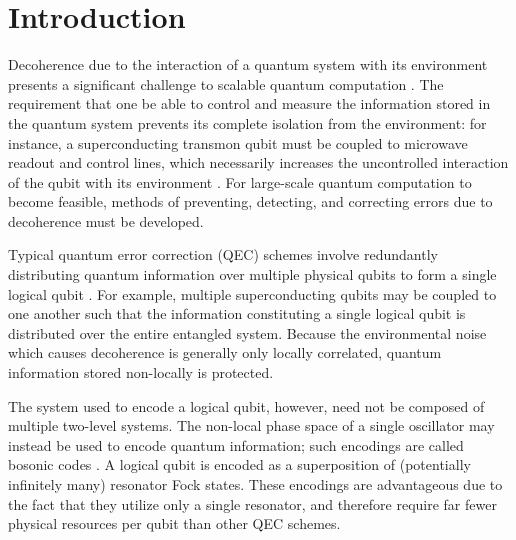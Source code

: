 \section{Introduction}

Decoherence due to the interaction of a quantum system with its environment presents a significant challenge to scalable quantum computation \cite{nielsen_chuang_2010}.
The requirement that one be able to control and measure the information stored in the quantum system prevents its complete isolation from the environment: for instance, a superconducting transmon qubit must be coupled to microwave readout and control lines, which necessarily increases the uncontrolled interaction of the qubit with its environment \cite{devoret_2013,wendin_2017}.
For large-scale quantum computation to become feasible, methods of preventing, detecting, and correcting errors due to decoherence must be developed.

Typical quantum error correction (QEC) schemes involve redundantly distributing quantum information over multiple physical qubits to form a single logical qubit \cite{nielsen_chuang_2010,wendin_2017,devoret_2013,raussendorf_2012}.
For example, multiple superconducting qubits may be coupled to one another such that the information constituting a single logical qubit is distributed over the entire entangled system.
Because the environmental noise which causes decoherence is generally only locally correlated, quantum information stored non-locally is protected.

The system used to encode a logical qubit, however, need not be composed of multiple two-level systems.
The non-local phase space of a single oscillator may instead be used to encode quantum information; such encodings are called bosonic codes \cite{cai_2021}.
A logical qubit is encoded as a superposition of (potentially infinitely many) resonator Fock states.
These encodings are advantageous due to the fact that they utilize only a single resonator, and therefore require far fewer physical resources per qubit than other QEC schemes.

